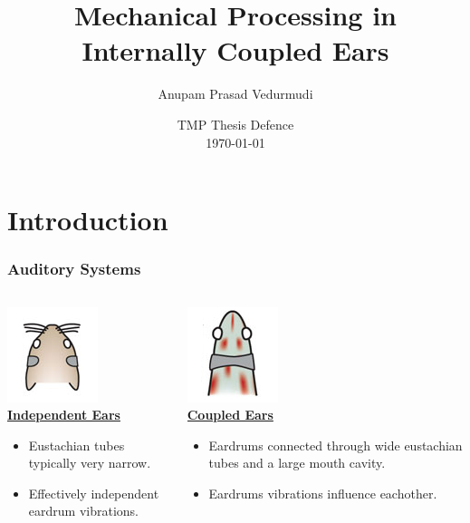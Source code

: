 \documentclass{beamer}
\title{\Large Mechanical Processing in Internally Coupled Ears}
\author{Anupam Prasad Vedurmudi}
\date{TMP Thesis Defence\\ \today}
\begin{document}
\begin{frame}
 \titlepage
 

\end{frame}


\section{Introduction}
\begin{frame}
\frametitle{Auditory Systems}

 \begin{columns}
 
    \begin{column}{0.5\textwidth}
    \centering
    \includegraphics[width = 1.5 cm]{Diagrams/Presentation/indepears.png}\\
    \underline{\textbf{Independent Ears}}
    \small
     \begin{itemize}
    \item[] Eustachian tubes typically very narrow.
     \item[] Effectively independent eardrum vibrations.
     \end{itemize}
    \end{column}
     
    \begin{column}{0.5\textwidth}
    \centering
    \includegraphics[width = 1.5 cm]{Diagrams/Presentation/coupledears.png}\\
    \underline{\textbf{Coupled Ears}}
    \small
     \begin{itemize}
         \item[] Eardrums connected through wide eustachian tubes and a large mouth cavity.
     \item[] Eardrums vibrations influence eachother.
     \end{itemize}
    \end{column}
    
  \end{columns}
  
\end{frame}
\end{document}
